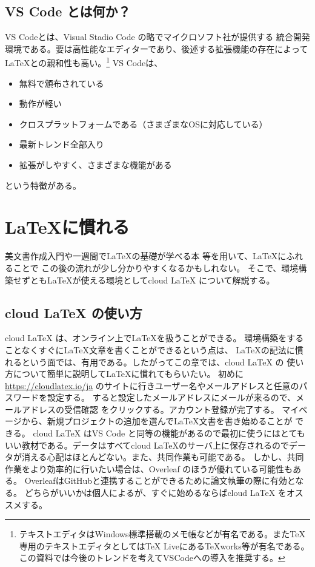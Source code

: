 \documentclass[titlepage]{ltjsarticle}
\begin{document}
\subsection{VS Code とは何か？}
VS Codeとは、Visual Stadio Code の略でマイクロソフト社が提供する
統合開発環境である。要は高性能なエディターであり、後述する拡張機能の存在によって\LaTeX との親和性も高い。\footnote{テキストエディタはWindows標準搭載のメモ帳などが有名である。またTeX専用のテキストエディタとしてはTeX LiveにあるTeXworks等が有名である。この資料では今後のトレンドを考えてVSCodeへの導入を推奨する。}
VS Codeは、
\begin{itemize}
  \item 無料で頒布されている
  \item 動作が軽い
  \item クロスプラットフォームである（さまざまなOSに対応している）
  \item 最新トレンド全部入り
  \item 拡張がしやすく、さまざまな機能がある
\end{itemize}
という特徴がある。

\section{\LaTeX に慣れる}
美文書作成入門\cite{美文書本}や一週間で\LaTeX の基礎が学べる本
\cite{一週間基礎}等を用いて、\LaTeX にふれることで
この後の流れが少し分かりやすくなるかもしれない。
そこで、環境構築せずとも\LaTeX が使える環境としてcloud LaTeX
について解説する。

\subsection{cloud LaTeX の使い方}
cloud LaTeX は、オンライン上で\LaTeX を扱うことができる。
環境構築をすることなくすぐに\LaTeX 文章を書くことができるという点は、
\LaTeX の記法に慣れるという面では、有用である。したがってこの章では、cloud LaTeX の
使い方について簡単に説明して\LaTeX に慣れてもらいたい。
初めに
\url{https://cloudlatex.io/ja}\cite{cloudlatexログインページ}
のサイトに行きユーザー名やメールアドレスと任意のパスワードを設定する。
すると設定したメールアドレスにメールが来るので、メールアドレスの受信確認
をクリックする。アカウント登録が完了する。
マイページから、新規プロジェクトの追加を選んで\LaTeX 文書を書き始めることが
できる。
cloud LaTeX はVS Code と同等の機能があるので最初に使うにはとてもいい教材である。データはすべてcloud LaTeXのサーバ上に保存されるのでデータが消える心配はほとんどない。また、共同作業も可能である。
しかし、共同作業をより効率的に行いたい場合は、Overleaf のほうが優れている可能性もある。
OverleafはGitHubと連携することができるために論文執筆の際に有効となる。
どちらがいいかは個人によるが、すぐに始めるならばcloud LaTeX をオススメする。
\end{document}
